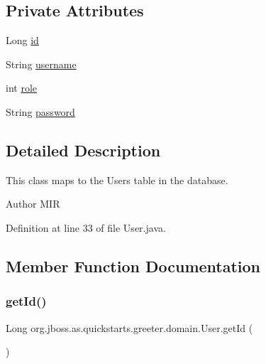 \subsection*{Private Attributes}
\begin{DoxyCompactItemize}
\item 
Long \hyperlink{classorg_1_1jboss_1_1as_1_1quickstarts_1_1greeter_1_1domain_1_1_user_af3536d853704d55f315310264ad6975f}{id}
\item 
String \hyperlink{classorg_1_1jboss_1_1as_1_1quickstarts_1_1greeter_1_1domain_1_1_user_a111bb41fcb9076cd724197685892ca16}{username}
\item 
int \hyperlink{classorg_1_1jboss_1_1as_1_1quickstarts_1_1greeter_1_1domain_1_1_user_aaa5b8e23cb8bde33d19e9fbf0f15009d}{role}
\item 
String \hyperlink{classorg_1_1jboss_1_1as_1_1quickstarts_1_1greeter_1_1domain_1_1_user_abd620665b4d038df44c8209ed851a99a}{password}
\end{DoxyCompactItemize}


\subsection{Detailed Description}
This class maps to the Users table in the database. 

\begin{DoxyAuthor}{Author}
M\+IR 
\end{DoxyAuthor}


Definition at line 33 of file User.\+java.



\subsection{Member Function Documentation}
\mbox{\label{classorg_1_1jboss_1_1as_1_1quickstarts_1_1greeter_1_1domain_1_1_user_a62025155c5f3ce35d3892b757b04d8bd}} 
\subsubsection{\texorpdfstring{get\+Id()}{getId()}}
{\footnotesize\ttfamily Long org.\+jboss.\+as.\+quickstarts.\+greeter.\+domain.\+User.\+get\+Id (\begin{DoxyParamCaption}{ }\end{DoxyParamCaption})}



